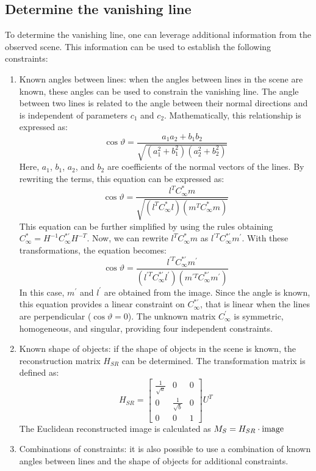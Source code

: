 \subsection*{Determine the vanishing line}
To determine the vanishing line, one can leverage additional information from the observed scene. 
This information can be used to establish the following constraints:
\begin{enumerate}
    \item Known angles between lines: when the angles between lines in the scene are known, these angles can be used to constrain the vanishing line. 
        The angle between two lines is related to the angle between their normal directions and is independent of parameters $c_1$ and $c_2$. 
        Mathematically, this relationship is expressed as:
        \[\cos\vartheta=\dfrac{a_1a_2+b_1b_2}{\sqrt{(a_1^2+b_1^2)(a_2^2+b_2^2)}}\]
        Here, $a_1$, $b_1$, $a_2$, and $b_2$ are coefficients of the normal vectors of the lines. 
        By rewriting the terms, this equation can be expressed as: 
        \[\cos\vartheta=\dfrac{l^TC_{\infty}^{*}m}{\sqrt{(l^TC_{\infty}^{*}l)(m^TC_{\infty}^{*}m)}}\]
        This equation can be further simplified by using the rules obtaining $C_{\infty}^{*}=H^{-1}C_{\infty}^{*'}H^{-T}$.  
        Now, we can rewrite $l^TC_{\infty}^{*}m$ as $l^{'T}C_{\infty}^{*'}m^{'}$. 
        With these transformations, the equation becomes:
        \[\cos\vartheta=\dfrac{l^{'T}C_{\infty}^{*'}m^{'}}{(l^{'T}C_{\infty}^{*'}l^{'})(m^{'T}C_{\infty}^{*'}m^{'})}\]
        In this case, $m^{'}$ and $l^{'}$ are obtained from the image. 
        Since the angle is known, this equation provides a linear constraint on $C_{\infty}^{*'}$, that is linear when the lines are perpendicular ($\cos\vartheta=0$).
        The unknown matrix $C_{\infty}^{'}$ is symmetric, homogeneous, and singular, providing four independent constraints.
    \item Known shape of objects: if the shape of objects in the scene is known, the reconstruction matrix $H_{SR}$ can be determined. 
        The transformation matrix is defined as:
        \[H_{SR}=
        \begin{bmatrix}
            \frac{1}{\sqrt{a}} & 0 & 0 \\
            0 & \frac{1}{\sqrt{b}} & 0 \\
            0 & 0 & 1
        \end{bmatrix}
        U^T
        \]
        The Euclidean reconstructed image is calculated as $M_S=H_{SR} \cdot \textnormal{image}$
    \item Combinations of constraints: it is also possible to use a combination of known angles between lines and the shape of objects for additional constraints.

\end{enumerate}
